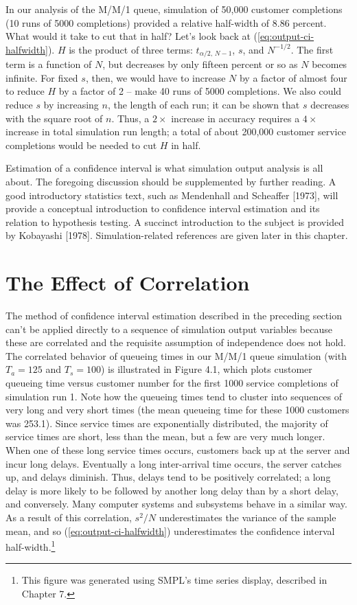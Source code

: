 In our analysis of the M/M/1 queue, simulation of 50,000 customer completions
(10 runs of 5000 completions) provided a relative half-width of 8.86 percent.
What would it take to cut that in half? Let's look back at
(\ref{eq:output-ci-halfwidth}). $H$ is the product of three terms:
$t_{\alpha/2,\,N-1}$, $s$, and $N^{-1/2}$. The first term is a function of $N$,
but decreases by only fifteen percent or so as $N$ becomes infinite. For fixed
$s$, then, we would have to increase $N$ by a factor of almost four to reduce
$H$ by a factor of 2 -- make 40 runs of 5000 completions. We also could reduce
$s$ by increasing $n$, the length of each run; it can be shown that $s$
decreases with the square root of $n$. Thus, a $2\times$ increase in accuracy
requires a $4\times$ increase in total simulation run length; a total of about
200,000 customer service completions would be needed to cut $H$ in half.

Estimation of a confidence interval is what simulation output analysis is all
about. The foregoing discussion should be supplemented by further reading. A
good introductory statistics text, such as Mendenhall and Scheaffer [1973],
will provide a conceptual introduction to confidence interval estimation and
its relation to hypothesis testing. A succinct introduction to the subject is
provided by Kobayashi [1978]. Simulation-related references are given later in
this chapter.

\section{The Effect of Correlation}
\label{sec:effect-of-correlation}

The method of confidence interval estimation described in the preceding
section can't be applied directly to a sequence of simulation output variables
because these are correlated and the requisite assumption of independence does
not hold. The correlated behavior of queueing times in our M/M/1 queue
simulation (with $T_a = 125$ and $T_s = 100$) is illustrated in Figure 4.1,
which plots customer queueing time versus customer number for the first 1000
service completions of simulation run 1. Note how the queueing times tend to
cluster into sequences of very long and very short times (the mean queueing
time for these 1000 customers was 253.1). Since service times are
exponentially distributed, the majority of service times are short, less than
the mean, but a few are very much longer. When one of these long service times
occurs, customers back up at the server and incur long delays. Eventually a
long inter-arrival time occurs, the server catches up, and delays diminish.
Thus, delays tend to be positively correlated; a long delay is more likely to
be followed by another long delay than by a short delay, and conversely. Many
computer systems and subsystems behave in a similar way. As a result of this
correlation, $s^2/N$ underestimates the variance of the sample mean, and so
(\ref{eq:output-ci-halfwidth}) underestimates the confidence interval
half-width.\footnote{This figure was generated using SMPL's time series
display, described in Chapter 7.}

